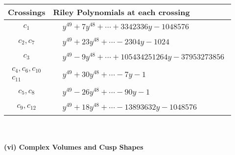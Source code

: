 \documentclass[1p]{elsarticle_modified}
\theoremstyle{definition}
\begin{document}
\begin{tabular}{m{50pt}|m{274pt}}
Crossings & \hspace{64pt}Riley Polynomials at each crossing \\
\hline $$\begin{aligned}c_{1}\end{aligned}$$&$\begin{aligned}
&y^{49}+7 y^{48}+\cdots+3342336 y-1048576
\end{aligned}$\\
\hline $$\begin{aligned}c_{2},c_{7}\end{aligned}$$&$\begin{aligned}
&y^{49}+23 y^{48}+\cdots-2304 y-1024
\end{aligned}$\\
\hline $$\begin{aligned}c_{3}\end{aligned}$$&$\begin{aligned}
&y^{49}-9 y^{48}+\cdots+105434251264 y-37953273856
\end{aligned}$\\
\hline $$\begin{aligned}c_{4},c_{6},c_{10}\\c_{11}\end{aligned}$$&$\begin{aligned}
&y^{49}+30 y^{48}+\cdots-7 y-1
\end{aligned}$\\
\hline $$\begin{aligned}c_{5},c_{8}\end{aligned}$$&$\begin{aligned}
&y^{49}-26 y^{48}+\cdots-90 y-1
\end{aligned}$\\
\hline $$\begin{aligned}c_{9},c_{12}\end{aligned}$$&$\begin{aligned}
&y^{49}+18 y^{48}+\cdots-13893632 y-1048576
\end{aligned}$\\
\hline
\end{tabular}\\~\\
\newpage\flushleft \textbf{(vi) Complex Volumes and Cusp Shapes}
\end{document}
